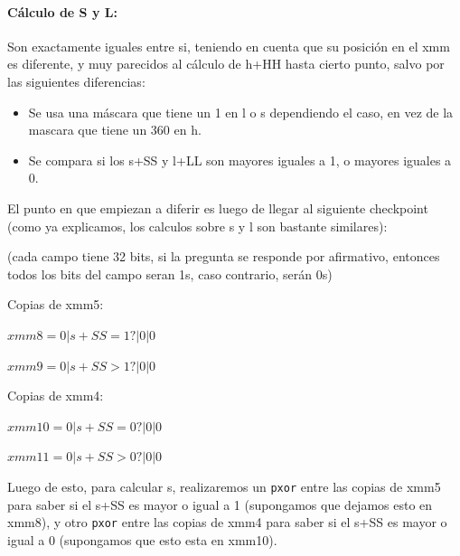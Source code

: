 \documentclass[a4paper]{article}
\begin{document}
\paragraph*{Cálculo de S y L:}

Son exactamente iguales entre si, teniendo en cuenta que su posición en el xmm es diferente, y muy parecidos al cálculo de h+HH hasta cierto punto, salvo por las siguientes diferencias:

\begin{itemize}
	\item Se usa una máscara que tiene un 1 en l o s dependiendo el caso, en vez de la mascara que tiene un 360 en h.
	\item Se compara si los s+SS y l+LL son mayores iguales a 1, o mayores iguales a 0.
\end{itemize}

El punto en que empiezan a diferir es luego de llegar al siguiente checkpoint (como ya explicamos, los calculos sobre s y l son bastante similares):

\vspace*{0.3cm}

(cada campo tiene 32 bits, si la pregunta se responde por afirmativo, entonces todos los bits del campo seran 1s, caso contrario, serán 0s)

\vspace*{0.3cm}

Copias de xmm5:

\vspace*{0.3cm}

$xmm8= 0 | s+SS = 1?| 0 | 0$

\vspace*{0.3cm} 

$xmm9=0 |s+SS > 1?| 0 | 0$

\vspace*{0.3cm}

Copias de xmm4:

\vspace*{0.3cm}

$xmm10= 0 |s+SS= 0?| 0 | 0$

\vspace*{0.3cm}

$xmm11= 0 |s+SS > 0?| 0 | 0$

\vspace*{0.3cm}

Luego de esto, para calcular s, realizaremos un {\tt pxor} entre las copias de xmm5 para saber si el s+SS es mayor o igual a 1 (supongamos que dejamos esto en xmm8), y otro {\tt pxor} entre las copias de xmm4 para saber si el s+SS es mayor o igual a 0 (supongamos que esto esta en xmm10).
\end{document}
